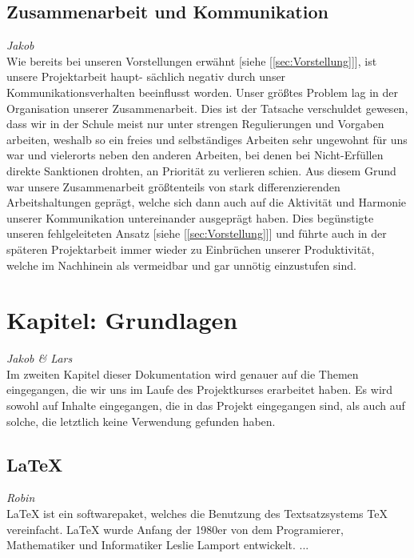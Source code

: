 \documentclass[12pt,a4paper,bibliography=totocnumbered,listof=totocnumbered]{scrartcl}
\begin{document}
\subsection{Zusammenarbeit und Kommunikation}
\emph{Jakob}\\
Wie bereits bei unseren Vorstellungen erwähnt [siehe [\ref{sec:Vorstellung}]], ist unsere Projektarbeit haupt- sächlich negativ durch unser Kommunikationsverhalten beeinflusst worden.
Unser größtes Problem lag in der Organisation unserer Zusammenarbeit. Dies ist der Tatsache verschuldet gewesen, dass wir in der Schule meist nur unter strengen Regulierungen und Vorgaben arbeiten, weshalb so ein freies und selbständiges Arbeiten sehr ungewohnt für uns war und vielerorts neben den anderen Arbeiten, bei denen bei \glqq Nicht-Erfüllen\grqq{} direkte Sanktionen drohten, an Priorität zu verlieren schien.
Aus diesem Grund war unsere Zusammenarbeit größtenteils von stark differenzierenden Arbeitshaltungen geprägt, welche sich dann auch auf die Aktivität und Harmonie unserer Kommunikation untereinander ausgeprägt haben.
Dies begünstigte unseren fehlgeleiteten Ansatz [siehe [\ref{sec:Vorstellung}]] und führte auch in der späteren Projektarbeit immer wieder zu Einbrüchen unserer Produktivität, welche im Nachhinein als vermeidbar und gar unnötig einzustufen sind.

\pagebreak

\section{Kapitel: Grundlagen}
\emph{Jakob \emph{\&} Lars}\\
Im zweiten Kapitel dieser Dokumentation wird genauer auf die Themen eingegangen, die wir uns im Laufe des Projektkurses erarbeitet haben. 
Es wird sowohl auf Inhalte eingegangen, die in das Projekt eingegangen sind, als auch auf solche, die letztlich keine Verwendung gefunden haben.

\subsection{LaTeX}
\label{sec:LaTeX}
\emph{Robin}\\
LaTeX ist ein softwarepaket, welches die Benutzung des Textsatzsystems TeX vereinfacht. LaTeX wurde Anfang der 1980er von dem Programierer, Mathematiker und Informatiker Leslie Lamport entwickelt.\cite{LaTeX}\cite{Lamport}
...
\end{document}
